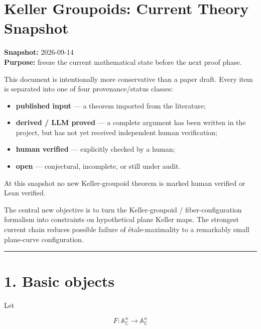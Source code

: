 \maketitle

\section{Keller Groupoids: Current Theory
Snapshot}\label{keller-groupoids-current-theory-snapshot}

\textbf{Snapshot:} 2026-09-14\\
\textbf{Purpose:} freeze the current mathematical state before the next
proof phase.

This document is intentionally more conservative than a paper draft.
Every item is separated into one of four provenance/status classes:

\begin{itemize}
\tightlist
\item
  \textbf{published input} --- a theorem imported from the literature;
\item
  \textbf{derived / LLM proved} --- a complete argument has been written
  in the project, but has not yet received independent human
  verification;
\item
  \textbf{human verified} --- explicitly checked by a human;
\item
  \textbf{open} --- conjectural, incomplete, or still under audit.
\end{itemize}

At this snapshot no new Keller-groupoid theorem is marked human verified
or Lean verified.

The central new objective is to turn the Keller-groupoid /
fiber-configuration formalism into constraints on hypothetical plane
Keller maps. The strongest current chain reduces possible failure of
étale-maximality to a remarkably small plane-curve configuration.

\begin{center}\rule{0.5\linewidth}{0.5pt}\end{center}

\section{1. Basic objects}\label{basic-objects}

Let

\[
F:\mathbb A^n_{\mathbb C}\longrightarrow \mathbb A^n_{\mathbb C}
\]

